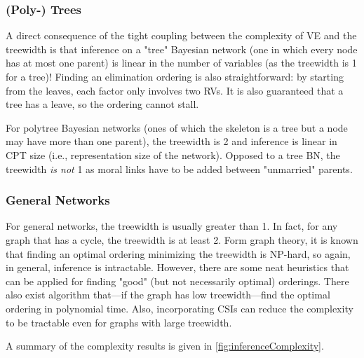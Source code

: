 			\subsubsection{(Poly-) Trees}
				A direct consequence of the tight coupling between the complexity of VE and the treewidth is that inference on a "tree" Bayesian network (one in which every node has at most one parent) is linear in the number of variables (as the treewidth is \num{1} for a tree)! Finding an elimination ordering is also straightforward: by starting from the leaves, each factor only involves two RVs. It is also guaranteed that a tree has a leave, so the ordering cannot stall.

				For polytree Bayesian networks (ones of which the skeleton is a tree but a node may have more than one parent), the treewidth is \num{2} and inference is linear in CPT size (i.e., representation size of the network). Opposed to a tree BN, the treewidth \emph{is not} \num{1} as moral links have to be added between "unmarried" parents.

			\subsubsection{General Networks}
				For general networks, the treewidth is usually greater than \num{1}. In fact, for any graph that has a cycle, the treewidth is at least \num{2}. Form graph theory, it is known that finding an optimal ordering minimizing the treewidth is NP-hard, so again, in general, inference is intractable. However, there are some neat heuristics that can be applied for finding "good" (but not necessarily optimal) orderings. There also exist algorithm that---if the graph has low treewidth---find the optimal ordering in polynomial time. Also, incorporating CSIs can reduce the complexity to be tractable even for graphs with large treewidth.

				A summary of the complexity results is given in \autoref{fig:inferenceComplexity}.

